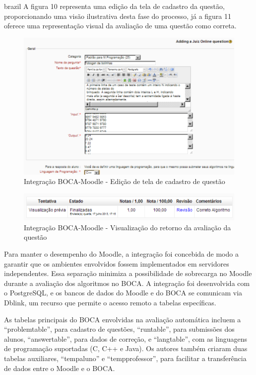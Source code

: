 \begin{otherlanguage*}{brazil}
A figura 10 representa uma edição da tela de cadastro da questão, proporcionando uma visão ilustrativa desta fase do processo, já a figura 11 oferece uma representação visual da avaliação de uma questão como correta.

\begin{figure}[h!]
	   \centering
            \caption{Integração BOCA-Moodle - Edição de tela de cadastro de questão}
            \label{fig:ModeloConceitual}
	   	\includegraphics[scale=0.4]{pictures/BOCA_edicao.png}
\end{figure}

\begin{figure}[h!]
	   \centering
            \caption{Integração BOCA-Moodle - Visualização do retorno da avaliação da questão}
            \label{fig:ModeloConceitual}
	   	\includegraphics[scale=0.4]{pictures/BOCA_visualizacao.png}
\end{figure}

Para manter o desempenho do Moodle, a integração foi concebida de modo a garantir que os ambientes envolvidos fossem implementados em servidores independentes. Essa separação minimiza a possibilidade de sobrecarga no Moodle durante a avaliação dos algoritmos no BOCA. A integração foi desenvolvida com o PostgreSQL, e os bancos de dados do Moodle e do BOCA se comunicam via Dblink, um recurso que permite o acesso remoto a tabelas específicas.

As tabelas principais do BOCA envolvidas na avaliação automática incluem a “problemtable”, para cadastro de questões, “runtable”, para submissões dos alunos, “answertable”, para dados de correção, e “langtable”, com as linguagens de programação suportadas (C, C++ e Java). Os autores também criaram duas tabelas auxiliares, “tempaluno” e “tempprofessor”, para facilitar a transferência de dados entre o Moodle e o BOCA.


\end{otherlanguage*}
